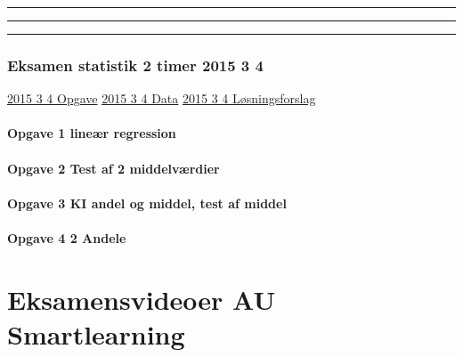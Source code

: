 \documentclass[]{book}
\let\oldparagraph\paragraph
\renewcommand{\paragraph}[1]{\oldparagraph{#1}\mbox{}}
\begin{document}
\begin{center}\rule{0.5\linewidth}{\linethickness}\end{center}

\begin{center}\rule{0.5\linewidth}{\linethickness}\end{center}

\begin{center}\rule{0.5\linewidth}{\linethickness}\end{center}

\hypertarget{eksamen-statistik-2-timer-2015-3-4}{%
\subsubsection{Eksamen statistik 2 timer 2015 3 4}\label{eksamen-statistik-2-timer-2015-3-4}}

\href{https://drive.google.com/file/d/0B1E7VnhxsDMlLVBMek5kWEhRZlU/view?usp=sharing}{2015 3 4 Opgave}
\href{https://drive.google.com/file/d/0B1E7VnhxsDMlX0p3Qk8wWlNxM28/view?usp=sharing}{2015 3 4 Data}
\href{https://drive.google.com/file/d/0B1E7VnhxsDMlWXNWTW55Sk94RDA/view?usp=sharing}{2015 3 4 Løsningsforslag}

\hypertarget{opgave-1-liner-regression-1}{%
\paragraph{Opgave 1 lineær regression}\label{opgave-1-liner-regression-1}}

\hypertarget{opgave-2-test-af-2-middelvrdier}{%
\paragraph{Opgave 2 Test af 2 middelværdier}\label{opgave-2-test-af-2-middelvrdier}}

\hypertarget{opgave-3-ki-andel-og-middel-test-af-middel}{%
\paragraph{Opgave 3 KI andel og middel, test af middel}\label{opgave-3-ki-andel-og-middel-test-af-middel}}

\hypertarget{opgave-4-2-andele}{%
\paragraph{Opgave 4 2 Andele}\label{opgave-4-2-andele}}

\hypertarget{eksamensvideoer-au-smartlearning}{%
\section{Eksamensvideoer AU Smartlearning}\label{eksamensvideoer-au-smartlearning}}
\end{document}
